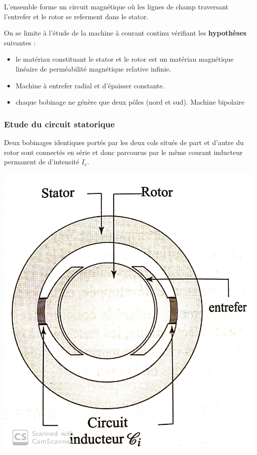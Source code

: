 \documentclass{article}
\begin{document}
L'ensemble forme un circuit magnétique où les lignes de champ traversant l'entrefer et le rotor se referment dans le stator.\medskip

On se limite à l'étude de la machine à courant continu vérifiant les \textbf{hypothèses} suivantes :

\begin{itemize}
    \item le matériau constituant le stator et le rotor est un matériau magnétique linéaire de perméabilité magnétique relative infinie.
    \item Machine à entrefer radial et d'épaisser constante.
    \item chaque bobinage ne génère que deux pôles (nord et sud). Machine bipolaire
    
\end{itemize}


\subsubsection*{Etude du circuit statorique}

Deux bobinages identiques portés par les deux cols situés de part et d'autre du rotor sont connectés en série et donc parcourus par le même courant inducteur permanent de d'intensité $I_e$.\medskip

\begin{center}
    \includegraphics[scale=0.1]{stator.jpg}
\end{center}
\end{document}

